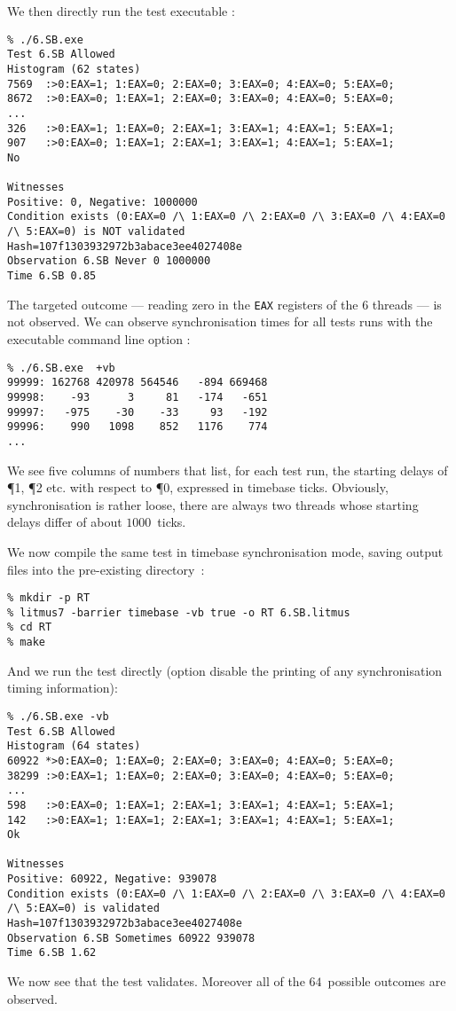 We then directly run the test executable :
\begin{verbatim}
% ./6.SB.exe
Test 6.SB Allowed
Histogram (62 states)
7569  :>0:EAX=1; 1:EAX=0; 2:EAX=0; 3:EAX=0; 4:EAX=0; 5:EAX=0;
8672  :>0:EAX=0; 1:EAX=1; 2:EAX=0; 3:EAX=0; 4:EAX=0; 5:EAX=0;
...
326   :>0:EAX=1; 1:EAX=0; 2:EAX=1; 3:EAX=1; 4:EAX=1; 5:EAX=1;
907   :>0:EAX=0; 1:EAX=1; 2:EAX=1; 3:EAX=1; 4:EAX=1; 5:EAX=1;
No

Witnesses
Positive: 0, Negative: 1000000
Condition exists (0:EAX=0 /\ 1:EAX=0 /\ 2:EAX=0 /\ 3:EAX=0 /\ 4:EAX=0 /\ 5:EAX=0) is NOT validated
Hash=107f1303932972b3abace3ee4027408e
Observation 6.SB Never 0 1000000
Time 6.SB 0.85
\end{verbatim}
The targeted outcome --- reading zero in the \verb+EAX+ registers
of the $6$ threads --- is not observed.
We can observe synchronisation times for all tests runs
with the executable  command line option :
\begin{verbatim}
% ./6.SB.exe  +vb
99999: 162768 420978 564546   -894 669468
99998:    -93      3     81   -174   -651
99997:   -975    -30    -33     93   -192
99996:    990   1098    852   1176    774
...
\end{verbatim}
We see five columns of numbers that list, for each test run,
the starting delays of \P{1}, \P{2} etc. with respect to \P{0}, expressed
in timebase ticks. Obviously, synchronisation is rather loose,
there are always two threads whose starting delays differ of
about $1000$~ticks.

We now compile the same test in timebase synchronisation mode,
saving \litmus{} output files into the pre-existing directory~:
\begin{verbatim}
% mkdir -p RT
% litmus7 -barrier timebase -vb true -o RT 6.SB.litmus
% cd RT
% make
\end{verbatim}
And we run the test directly
(option  disable the printing of any
synchronisation timing information):
\begin{verbatim}
% ./6.SB.exe -vb
Test 6.SB Allowed
Histogram (64 states)
60922 *>0:EAX=0; 1:EAX=0; 2:EAX=0; 3:EAX=0; 4:EAX=0; 5:EAX=0;
38299 :>0:EAX=1; 1:EAX=0; 2:EAX=0; 3:EAX=0; 4:EAX=0; 5:EAX=0;
...
598   :>0:EAX=0; 1:EAX=1; 2:EAX=1; 3:EAX=1; 4:EAX=1; 5:EAX=1;
142   :>0:EAX=1; 1:EAX=1; 2:EAX=1; 3:EAX=1; 4:EAX=1; 5:EAX=1;
Ok

Witnesses
Positive: 60922, Negative: 939078
Condition exists (0:EAX=0 /\ 1:EAX=0 /\ 2:EAX=0 /\ 3:EAX=0 /\ 4:EAX=0 /\ 5:EAX=0) is validated
Hash=107f1303932972b3abace3ee4027408e
Observation 6.SB Sometimes 60922 939078
Time 6.SB 1.62
\end{verbatim}
We now see that the test validates. Moreover
all of the $64$~possible outcomes are observed.

